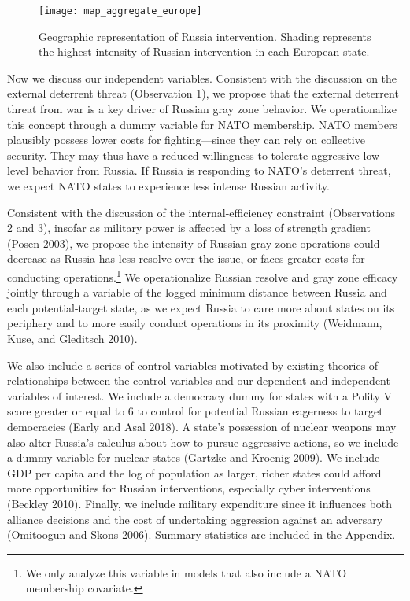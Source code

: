 \documentclass[
]{article}
\begin{document}
\begin{figure}[h!]
\texttt{[image: map\_aggregate\_europe]} \caption{Geographic representation of Russia intervention. Shading represents the highest intensity of Russian intervention in each European state.}\label{fig:map}
\end{figure}

Now we discuss our independent variables. Consistent with the discussion on the external deterrent threat (Observation 1), we propose that the external deterrent threat from war is a key driver of Russian gray zone behavior. We operationalize this concept through a dummy variable for NATO membership. NATO members plausibly possess lower costs for fighting---since they can rely on collective security. They may thus have a reduced willingness to tolerate aggressive low-level behavior from Russia. If Russia is responding to NATO's deterrent threat, we expect NATO states to experience less intense Russian activity.

Consistent with the discussion of the internal-efficiency constraint (Observations 2 and 3), insofar as military power is affected by a loss of strength gradient (Posen 2003), we propose the intensity of Russian gray zone operations could decrease as Russia has less resolve over the issue, or faces greater costs for conducting operations.\footnote{We only analyze this variable in models that also include a NATO membership covariate.} We operationalize Russian resolve and gray zone efficacy jointly through a variable of the logged minimum distance between Russia and each potential-target state, as we expect Russia to care more about states on its periphery and to more easily conduct operations in its proximity (Weidmann, Kuse, and Gleditsch 2010).

We also include a series of control variables motivated by existing theories of relationships between the control variables and our dependent and independent variables of interest. We include a democracy dummy for states with a Polity V score greater or equal to 6 to control for potential Russian eagerness to target democracies (Early and Asal 2018). A state's possession of nuclear weapons may also alter Russia's calculus about how to pursue aggressive actions, so we include a dummy variable for nuclear states (Gartzke and Kroenig 2009). We include GDP per capita and the log of population as larger, richer states could afford more opportunities for Russian interventions, especially cyber interventions (Beckley 2010). Finally, we include military expenditure since it influences both alliance decisions and the cost of undertaking aggression against an adversary (Omitoogun and Skons 2006). Summary statistics are included in the Appendix.
\end{document}
